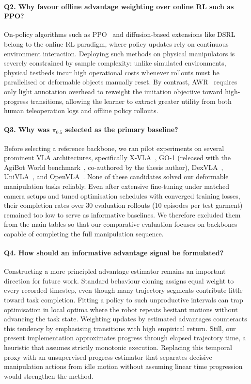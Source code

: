 \paragraph{Q2. Why favour offline advantage weighting over online RL such as PPO?}
On-policy algorithms such as PPO~\cite{schulman2017PPO} and diffusion-based extensions like DSRL~\cite{wagenmaker2025dsrl} belong to the online RL paradigm, where policy updates rely on continuous environment interaction. Deploying such methods on physical manipulators is severely constrained by sample complexity: unlike simulated environments, physical testbeds incur high operational costs whenever rollouts must be parallelised or deformable objects manually reset. By contrast, AWR~\cite{peng2019awr} requires only light annotation overhead to reweight the imitation objective toward high-progress transitions, allowing the learner to extract greater utility from both human teleoperation logs and offline policy rollouts.

\paragraph{Q3. Why was $\pi_{0.5}$ selected as the primary baseline?}
Before selecting a reference backbone, we ran pilot experiments on several prominent VLA architectures, specifically X-VLA~\cite{zheng2025xvla}, GO-1 (released with the AgiBot World benchmark~\cite{bu2025agibot_iros}, co-authored by the thesis author), DexVLA~\cite{wen2025dexvla}, UniVLA~\cite{bu2025univla}, and OpenVLA~\cite{kim2024openvla}. None of these candidates solved our deformable manipulation tasks reliably. Even after extensive fine-tuning under matched camera setups and tuned optimisation schedules with converged training losses, their completion rates over 30 evaluation rollouts (10 episodes per test garment) remained too low to serve as informative baselines. We therefore excluded them from the main tables so that our comparative evaluation focuses on backbones capable of completing the full manipulation sequence.

\paragraph{Q4. How should an informative advantage signal be formulated?}
Constructing a more principled advantage estimator remains an important direction for future work. Standard behaviour cloning assigns equal weight to every recorded timestep, even though many trajectory segments contribute little toward task completion. Fitting a policy to such unproductive intervals can trap optimisation in local optima where the robot repeats hesitant motions without advancing the task state. Weighting updates by estimated advantages counteracts this tendency by emphasising transitions with high empirical return. Still, our present implementation approximates progress through elapsed trajectory time, a heuristic that assumes strictly monotonic execution. Replacing this temporal proxy with an unsupervised progress estimator that separates decisive manipulation actions from idle motion without assuming linear time progression would strengthen the method.

